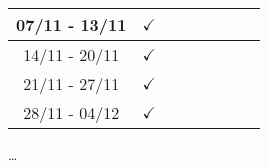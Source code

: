 \documentclass[a4paper,10pt]{article}
\begin{document}
\begin{tabular}{|c|c|c|c|c|c|c|c|}
07/11 - 13/11 & $\checkmark$ &              &              &              &              &              &              \\ \hline
14/11 - 20/11 & $\checkmark$ &              &              &              &              &              &              \\ \hline
21/11 - 27/11 & $\checkmark$ &              &              &              &              &              &              \\ \hline
28/11 - 04/12 & $\checkmark$ &              &              &              &              &              &              \\ \hline
\end{tabular}

\ldots
\end{document}
